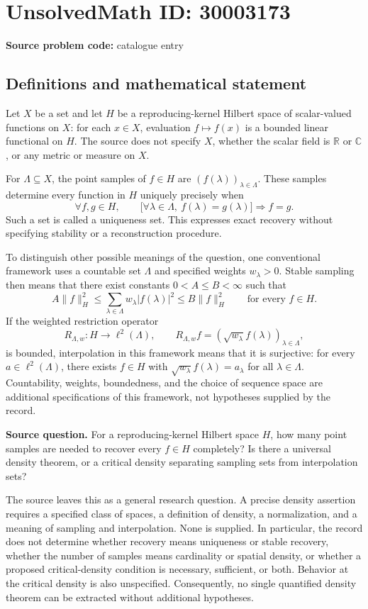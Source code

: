 \documentclass[11pt]{article}
\newcommand{\R}{\mathbb{R}}
\newcommand{\C}{\mathbb{C}}
\begin{document}
\section*{UnsolvedMath ID: 30003173}
\textbf{Source problem code:} catalogue entry
\subsection{Definitions and mathematical statement}
Let \(X\) be a set and let \(H\) be a reproducing-kernel Hilbert space of scalar-valued functions on \(X\): for each \(x\in X\), evaluation \(f\mapsto f(x)\) is a bounded linear functional on \(H\). The source does not specify \(X\), whether the scalar field is \(\R\) or \(\C\), or any metric or measure on \(X\).

For \(\Lambda\subseteq X\), the point samples of \(f\in H\) are \((f(\lambda))_{\lambda\in\Lambda}\). These samples determine every function in \(H\) uniquely precisely when
\[
\forall f,g\in H,\qquad
\bigl[\forall\lambda\in\Lambda,\ f(\lambda)=g(\lambda)\bigr]
\Longrightarrow f=g.
\]
Such a set is called a uniqueness set. This expresses exact recovery without specifying stability or a reconstruction procedure.

To distinguish other possible meanings of the question, one conventional framework uses a countable set \(\Lambda\) and specified weights \(w_\lambda>0\). Stable sampling then means that there exist constants \(0<A\leq B<\infty\) such that
\[
A\lVert f\rVert_H^2
\leq \sum_{\lambda\in\Lambda}w_\lambda|f(\lambda)|^2
\leq B\lVert f\rVert_H^2
\qquad\text{for every }f\in H.
\]
If the weighted restriction operator
\[
R_{\Lambda,w}:H\longrightarrow\ell^2(\Lambda),\qquad
R_{\Lambda,w}f=(\sqrt{w_\lambda}f(\lambda))_{\lambda\in\Lambda},
\]
is bounded, interpolation in this framework means that it is surjective: for every \(a\in\ell^2(\Lambda)\), there exists \(f\in H\) with \(\sqrt{w_\lambda}f(\lambda)=a_\lambda\) for all \(\lambda\in\Lambda\). Countability, weights, boundedness, and the choice of sequence space are additional specifications of this framework, not hypotheses supplied by the record.

\textbf{Source question.} For a reproducing-kernel Hilbert space \(H\), how many point samples are needed to recover every \(f\in H\) completely? Is there a universal density theorem, or a critical density separating sampling sets from interpolation sets?

The source leaves this as a general research question. A precise density assertion requires a specified class of spaces, a definition of density, a normalization, and a meaning of sampling and interpolation. None is supplied. In particular, the record does not determine whether recovery means uniqueness or stable recovery, whether the number of samples means cardinality or spatial density, or whether a proposed critical-density condition is necessary, sufficient, or both. Behavior at the critical density is also unspecified. Consequently, no single quantified density theorem can be extracted without additional hypotheses.
\end{document}
